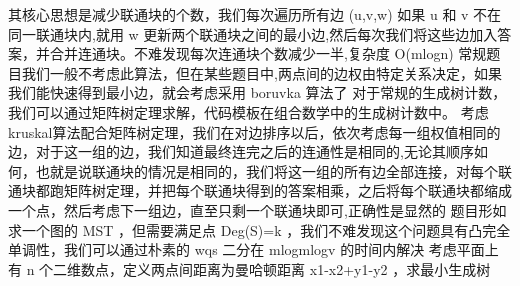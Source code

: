 {}其核心思想是减少联通块的个数，我们每次遍历所有边\markdownRendererDollarSign{} (u,v,w) \markdownRendererDollarSign{}如果\markdownRendererDollarSign{} u \markdownRendererDollarSign{}和\markdownRendererDollarSign{} v \markdownRendererDollarSign{}不在同一联通块内,就用\markdownRendererDollarSign{} w \markdownRendererDollarSign{}更新两个联通块之间的最小边,然后每次我们将这些边加入答案，并合并连通块。不难发现每次连通块个数减少一半,复杂度\markdownRendererDollarSign{} O(mlogn) \markdownRendererDollarSign{}\markdownRendererParagraphSeparator
{}常规题目我们一般不考虑此算法，但在某些题目中,两点间的边权由特定关系决定，如果我们能快速得到最小边，就会考虑采用\markdownRendererDollarSign{} boruvka \markdownRendererDollarSign{}算法了\markdownRendererInterblockSeparator
{}
\markdownRendererSectionEnd \markdownRendererSectionBegin
{}\markdownRendererInterblockSeparator
{}\markdownRendererInterblockSeparator
{}
\markdownRendererSectionEnd 
\markdownRendererSectionEnd \markdownRendererSectionBegin
{}\markdownRendererInterblockSeparator
{}对于常规的生成树计数，我们可以通过矩阵树定理求解，代码模板在组合数学中的生成树计数中。\markdownRendererInterblockSeparator
{}\markdownRendererSectionBegin
{}\markdownRendererInterblockSeparator
{}考虑kruskal算法配合矩阵树定理，我们在对边排序以后，依次考虑每一组权值相同的边，对于这一组的边，我们知道最终连完之后的连通性是相同的,无论其顺序如何，也就是说联通块的情况是相同的，我们将这一组的所有边全部连接，对每个联通块都跑矩阵树定理，并把每个联通块得到的答案相乘，之后将每个联通块都缩成一个点，然后考虑下一组边，直至只剩一个联通块即可,正确性是显然的\markdownRendererInterblockSeparator
{}
\markdownRendererSectionEnd 
\markdownRendererSectionEnd \markdownRendererSectionBegin
{}\markdownRendererInterblockSeparator
{}题目形如求一个图的\markdownRendererDollarSign{} MST \markdownRendererDollarSign{}，但需要满足点\markdownRendererDollarSign{} Deg(S)=k \markdownRendererDollarSign{}，我们不难发现这个问题具有凸完全单调性，我们可以通过朴素的\markdownRendererDollarSign{} wqs \markdownRendererDollarSign{}二分在\markdownRendererDollarSign{} mlogmlogv \markdownRendererDollarSign{}的时间内解决\markdownRendererInterblockSeparator
{}
\markdownRendererSectionEnd \markdownRendererSectionBegin
{}\markdownRendererInterblockSeparator
{}考虑平面上有\markdownRendererDollarSign{} n \markdownRendererDollarSign{}个二维数点，定义两点间距离为曼哈顿距离\markdownRendererDollarSign{} \markdownRendererPipe{}x1-x2\markdownRendererPipe{}+\markdownRendererPipe{}y1-y2\markdownRendererPipe{} \markdownRendererDollarSign{}，求最小生成树\markdownRendererParagraphSeparator

